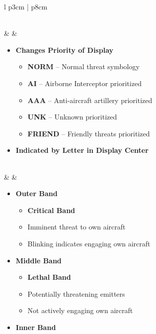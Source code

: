 \documentclass[8pt,usenames,dvipsnames,twoside]{article}
\begin{document}
\begin{center}
\begin{longtable}{l p{3cm} | p{8cm}}
\begin{minipage}[t]{\linewidth}
				\end{minipage} \\
				\midrule
				\textbullet &   &
				\begin{minipage}[t]{\linewidth}
					\vspace{-7pt}
					\begin{itemize}
						\item \textbf{Changes Priority of Display}
						\begin{itemize}
							\item \textbf{NORM} -- Normal threat symbology
							\item \textbf{AI} -- Airborne Interceptor prioritized
							\item \textbf{AAA} -- Anti-aircraft artillery prioritized
							\item \textbf{UNK} -- Unknown prioritized
							\item \textbf{FRIEND} -- Friendly threats prioritized
						\end{itemize}
						\item \textbf{Indicated by Letter in Display Center}
					\end{itemize}
				\end{minipage} \\
				\midrule
				\textbullet &  & 
				\begin{minipage}[t]{\linewidth}
					\vspace{-7pt}
					\begin{itemize}
						\item \textbf{Outer Band}
						\begin{itemize}
							\item \textbf{Critical Band}
							\item Imminent threat to own aircraft
							\item Blinking indicates engaging own aircraft
						\end{itemize}
						\item \textbf{Middle Band}
						\begin{itemize}
							\item \textbf{Lethal Band}
							\item Potentially threatening emitters
							\item Not actively engaging own aircraft
						\end{itemize}
						\item \textbf{Inner Band} 
						\begin{itemize}

\end{itemize}
\end{itemize}
\end{minipage}
\end{longtable}
\end{center}
\end{document}
